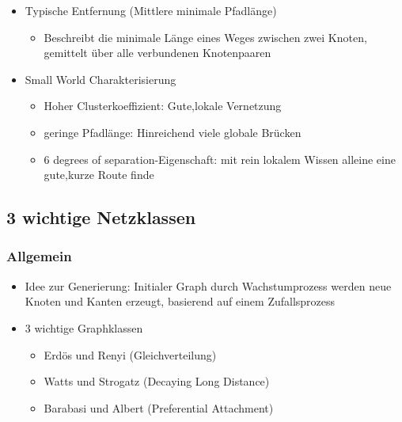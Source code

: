 \documentclass{article} %
\begin{document}
\begin{itemize}
\begin{itemize}
\begin{center}
			\end{center}
		\end{itemize}
		\item Typische Entfernung (Mittlere minimale Pfadlänge)
		\begin{itemize}
			\item Beschreibt die minimale Länge eines Weges zwischen zwei Knoten, gemittelt über alle verbundenen Knotenpaaren
		\end{itemize}
		\item Small World Charakterisierung
		\begin{itemize}
			\item Hoher Clusterkoeffizient: Gute,lokale Vernetzung
			\item geringe Pfadlänge: Hinreichend viele globale Brücken
			\item 6 degrees of separation-Eigenschaft: mit rein lokalem Wissen alleine eine gute,kurze Route finde
		\end{itemize}
	\end{itemize}
	\subsection{3 wichtige Netzklassen}
	\subsubsection{Allgemein}
	\begin{itemize}
		\item Idee zur Generierung: Initialer Graph durch Wachstumprozess werden neue Knoten und Kanten erzeugt, basierend auf einem Zufallsprozess
		\item 3 wichtige Graphklassen
		\begin{itemize}
			\item Erdös und Renyi (Gleichverteilung)
			\item Watts und Strogatz (Decaying Long Distance)
			\item Barabasi und Albert (Preferential Attachment)
		\end{itemize}
	\end{itemize}
\end{document}
